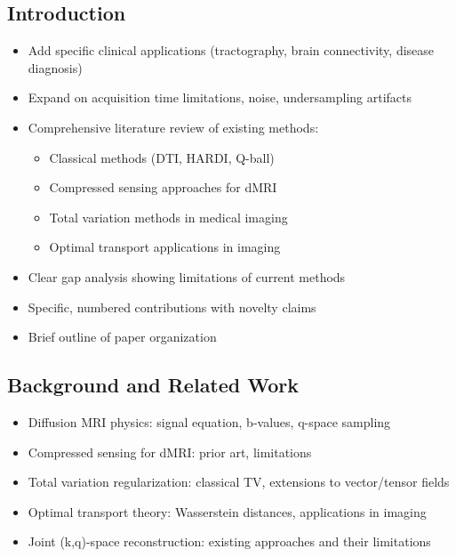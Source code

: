 \documentclass[journal,twoside,web]{ieeecolor}
\begin{document}
\subsection{Introduction}
\begin{itemize}
    \item Add specific clinical applications (tractography, brain connectivity, disease diagnosis)
    \item Expand on acquisition time limitations, noise, undersampling artifacts
    \item Comprehensive literature review of existing methods:
    \begin{itemize}
        \item Classical methods (DTI, HARDI, Q-ball)
        \item Compressed sensing approaches for dMRI
        \item Total variation methods in medical imaging
        \item Optimal transport applications in imaging
    \end{itemize}
    \item Clear gap analysis showing limitations of current methods
    \item Specific, numbered contributions with novelty claims
    \item Brief outline of paper organization
\end{itemize}

\subsection{Background and Related Work}
\begin{itemize}
    \item Diffusion MRI physics: signal equation, b-values, q-space sampling
    \item Compressed sensing for dMRI: prior art, limitations
    \item Total variation regularization: classical TV, extensions to vector/tensor fields
    \item Optimal transport theory: Wasserstein distances, applications in imaging
    \item Joint (k,q)-space reconstruction: existing approaches and their limitations
\end{itemize}
\end{document}
